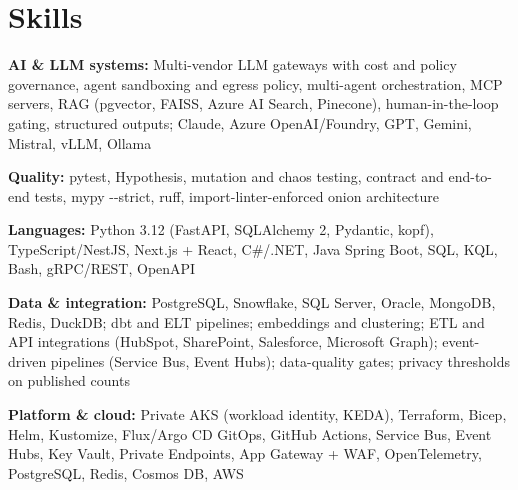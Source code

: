\documentclass[10pt,letterpaper]{article}
\newcommand{\szmeta}{\fontsize{8pt}{10pt}\selectfont}
\begin{document}
\section*{Skills}
{\szmeta \textbf{AI \& LLM systems:} Multi-vendor LLM gateways with cost and policy governance, agent sandboxing and egress policy, multi-agent orchestration, MCP servers, RAG (pgvector, FAISS, Azure AI Search, Pinecone), human-in-the-loop gating, structured outputs; Claude, Azure OpenAI/Foundry, GPT, Gemini, Mistral, vLLM, Ollama\par\vspace{2pt}\textbf{Quality:} pytest, Hypothesis, mutation and chaos testing, contract and end-to-end tests, mypy -{}-strict, ruff, import-linter-enforced onion architecture\par\vspace{2pt}\textbf{Languages:} Python 3.12 (FastAPI, SQLAlchemy 2, Pydantic, kopf), TypeScript/NestJS, Next.js + React, C\#/.NET, Java Spring Boot, SQL, KQL, Bash, gRPC/REST, OpenAPI\par\vspace{2pt}\textbf{Data \& integration:} PostgreSQL, Snowflake, SQL Server, Oracle, MongoDB, Redis, DuckDB; dbt and ELT pipelines; embeddings and clustering; ETL and API integrations (HubSpot, SharePoint, Salesforce, Microsoft Graph); event-driven pipelines (Service Bus, Event Hubs); data-quality gates; privacy thresholds on published counts\par\vspace{2pt}\textbf{Platform \& cloud:} Private AKS (workload identity, KEDA), Terraform, Bicep, Helm, Kustomize, Flux/Argo CD GitOps, GitHub Actions, Service Bus, Event Hubs, Key Vault, Private Endpoints, App Gateway + WAF, OpenTelemetry, PostgreSQL, Redis, Cosmos DB, AWS}\par
\end{document}
